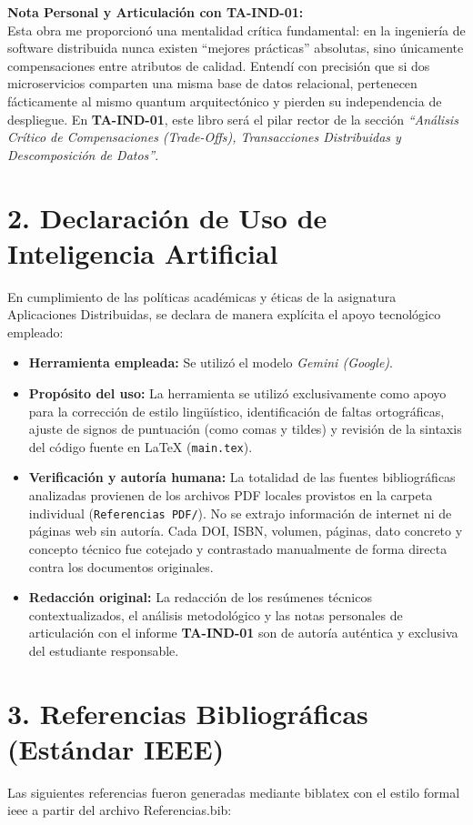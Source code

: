 \documentclass[11pt,a4paper]{article}
\begin{document}
\vspace{2mm}
\noindent\textbf{Nota Personal y Articulación con TA-IND-01:}\\
Esta obra me proporcionó una mentalidad crítica fundamental: en la ingeniería de software distribuida nunca existen ``mejores prácticas'' absolutas, sino únicamente compensaciones entre atributos de calidad. Entendí con precisión que si dos microservicios comparten una misma base de datos relacional, pertenecen fácticamente al mismo quantum arquitectónico y pierden su independencia de despliegue. En \textbf{TA-IND-01}, este libro será el pilar rector de la sección \textit{``Análisis Crítico de Compensaciones (Trade-Offs), Transacciones Distribuidas y Descomposición de Datos''}.

\vspace{5mm}

\vspace{6mm}

\section*{2. Declaración de Uso de Inteligencia Artificial}
En cumplimiento de las políticas académicas y éticas de la asignatura Aplicaciones Distribuidas, se declara de manera explícita el apoyo tecnológico empleado:

\begin{itemize}
    \item \textbf{Herramienta empleada:} Se utilizó el modelo \textit{Gemini (Google)}.
    \item \textbf{Propósito del uso:} La herramienta se utilizó exclusivamente como apoyo para la corrección de estilo lingüístico, identificación de faltas ortográficas, ajuste de signos de puntuación (como comas y tildes) y revisión de la sintaxis del código fuente en LaTeX (\texttt{main.tex}).
    \item \textbf{Verificación y autoría humana:} La totalidad de las fuentes bibliográficas analizadas provienen de los archivos PDF locales provistos en la carpeta individual (\texttt{Referencias PDF/}). No se extrajo información de internet ni de páginas web sin autoría. Cada DOI, ISBN, volumen, páginas, dato concreto y concepto técnico fue cotejado y contrastado manualmente de forma directa contra los documentos originales.
    \item \textbf{Redacción original:} La redacción de los resúmenes técnicos contextualizados, el análisis metodológico y las notas personales de articulación con el informe \textbf{TA-IND-01} son de autoría auténtica y exclusiva del estudiante responsable.
\end{itemize}

\vspace{5mm}

\newpage

\section*{3. Referencias Bibliográficas (Estándar IEEE)}
Las siguientes referencias fueron generadas mediante biblatex con el estilo formal ieee a partir del archivo Referencias.bib:

\printbibliography[heading=none]
\end{document}
